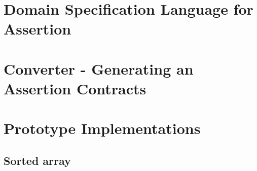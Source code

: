 \documentclass[runningheads]{llncs}
\begin{document}


 

\section{Domain Specification Language for Assertion}
\section{Converter - Generating an Assertion Contracts} 
\section{Prototype Implementations}
\subsection{Sorted array}
\end{document}
